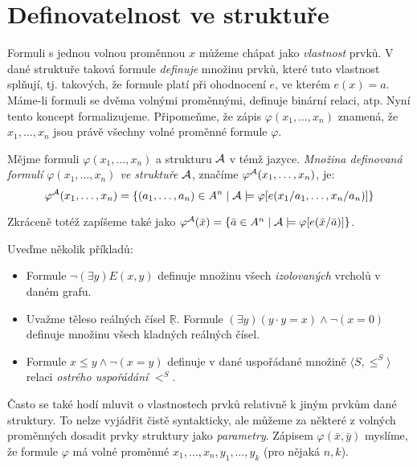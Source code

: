 \section{Definovatelnost ve struktuře}\label{section:definability}

Formuli s jednou volnou proměnnou $x$ můžeme chápat jako \emph{vlastnost} prvků. V dané struktuře taková formule \emph{definuje} množinu prvků, které tuto vlastnost splňují, tj. takových, že formule platí při ohodnocení $e$, ve kterém $e(x)=a$. Máme-li formuli se dvěma volnými proměnnými, definuje binární relaci, atp. Nyní tento koncept formalizujeme. Připomeňme, že zápis $\varphi(x_1,\dots,x_n)$ znamená, že $x_1,\dots,x_n$ jsou právě všechny volné proměnné formule $\varphi$.

\begin{definition}
    Mějme formuli $\varphi(x_1,\dots,x_n)$ a strukturu $\mathcal{A}$ v témž jazyce. \emph{Množina definovaná formulí $\varphi(x_1,\dots,x_n)$ ve struktuře $\mathcal{A}$}, značíme $\varphi^{\mathcal{A}}(x_1,\dots,x_n)$, je:
    $$
    \varphi^{\mathcal{A}}(x_1,\dots,x_n)=\{(a_1,\dots,a_n)\in A^n\mid\mathcal{A}\models\varphi[e(x_1/a_1,\dots,x_n/a_n)]\}
    $$
\end{definition}
Zkráceně totéž zapíšeme také jako $\varphi^{\mathcal{A}}(\bar x)=\{\bar a\in A^n\mid\mathcal{A}\models\varphi[e(\bar x/\bar a)]\}$.

\begin{example} Uveďme několik příkladů:
    \begin{itemize}
        \item Formule $\neg(\exists y)E(x,y)$ definuje množinu všech \emph{izolovaných} vrcholů v daném grafu.
        \item Uvažme těleso reálných čísel $\underline{\mathbb R}$. Formule $(\exists y)(y\cdot y=x)\land\neg (x=0)$ definuje množinu všech kladných reálných čísel.
        \item Formule $x\leq y\land \neg (x=y)$ definuje v dané uspořádané množině $\langle S,\leq^S\rangle$ relaci \emph{ostrého uspořádání} $<^S$. 
    \end{itemize}
\end{example}

Často se také hodí mluvit o vlastnostech prvků relativně k jiným prvkům dané struktury. To nelze vyjádřit čistě syntakticky, ale můžeme za některé z volných proměnných dosadit prvky struktury jako \emph{parametry}. Zápisem $\varphi(\bar x,\bar y)$ myslíme, že formule $\varphi$ má volné proměnné $x_1,\dots,x_n,y_1,\dots,y_k$ (pro nějaká $n,k$).

